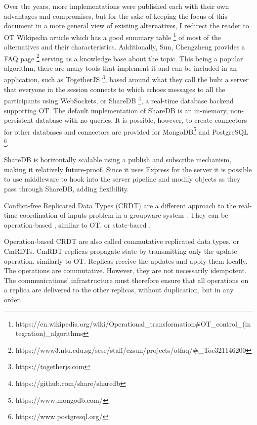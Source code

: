 Over the years, more implementations were published each with their own advantages and compromises, but for the sake of keeping the focus of this document in a more general view of existing alternatives, I redirect the reader to OT Wikipedia article which has a good summary table \footnote{https://en.wikipedia.org/wiki/Operational\_transformation\#OT\_control\_(integration)\_algorithms} of most of the alternatives and their characteristics. Additionally, Sun, Chengzheng provides a FAQ page \footnote{https://www3.ntu.edu.sg/scse/staff/czsun/projects/otfaq/\#\_Toc321146200} serving as a knowledge base about the topic. This being a popular algorithm, there are many tools that implement it and can be included in an application, such as TogetherJS \footnote{https://togetherjs.com}, based around what they call the hub: a server that everyone in the session connects to which echoes messages to all the participants using WebSockets, or ShareDB \footnote{https://github.com/share/sharedb}, a real-time database backend supporting OT. The default implementation of ShareDB is an in-memory, non-persistent database with no queries. It is possible, however, to create connectors for other databases and connectors are provided for MongoDB\footnote{https://www.mongodb.com/} and PostgreSQL \footnote{https://www.postgresql.org/}.

ShareDB is horizontally scalable using a publish and subscribe mechanism, making it relatively future-proof. Since it uses Express for the server it is possible to use middleware to hook into the server pipeline and modify objects as they pass through ShareDB, adding flexibility.

Conflict-free Replicated Data Types (CRDT) are a different approach to the real-time coordination of inputs problem in a groupware system \cite{Shapiro2011}. They can be operation-based \cite{Letia2010} \cite{Baquero2014}, similar to OT, or state-based \cite{Baquero1999} \cite{Almeida2014}.

Operation-based CRDT are also called commutative replicated data types, or CmRDTs. CmRDT replicas propagate state by transmitting only the update operation, similarly to OT. Replicas receive the updates and apply them locally. The operations are commutative. However, they are not necessarily idempotent. The communications' infrastructure must therefore ensure that all operations on a replica are delivered to the other replicas, without duplication, but in any order.

